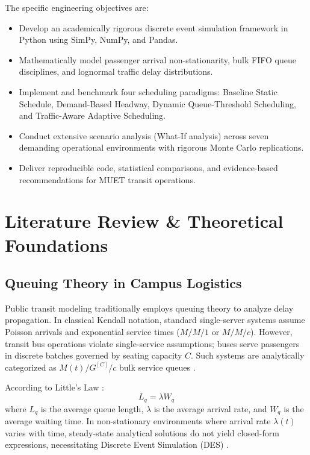\documentclass[conference]{IEEEtran}
\begin{document}
The specific engineering objectives are:
\begin{itemize}
    \item Develop an academically rigorous discrete event simulation framework in Python using SimPy, NumPy, and Pandas.
    \item Mathematically model passenger arrival non-stationarity, bulk FIFO queue disciplines, and lognormal traffic delay distributions.
    \item Implement and benchmark four scheduling paradigms: Baseline Static Schedule, Demand-Based Headway, Dynamic Queue-Threshold Scheduling, and Traffic-Aware Adaptive Scheduling.
    \item Conduct extensive scenario analysis (What-If analysis) across seven demanding operational environments with rigorous Monte Carlo replications.
    \item Deliver reproducible code, statistical comparisons, and evidence-based recommendations for MUET transit operations.
\end{itemize}

\section{Literature Review \& Theoretical Foundations}
\subsection{Queuing Theory in Campus Logistics}
Public transit modeling traditionally employs queuing theory to analyze delay propagation. In classical Kendall notation, standard single-server systems assume Poisson arrivals and exponential service times ($M/M/1$ or $M/M/c$). However, transit bus operations violate single-service assumptions; buses serve passengers in discrete batches governed by seating capacity $C$. Such systems are analytically categorized as $M(t)/G^{[C]}/c$ bulk service queues \cite{gross2008fundamentals, larson1981urban}. 

According to Little's Law \cite{little1961proof}:
\begin{equation}
L_q = \lambda W_q
\end{equation}
where $L_q$ is the average queue length, $\lambda$ is the average arrival rate, and $W_q$ is the average waiting time. In non-stationary environments where arrival rate $\lambda(t)$ varies with time, steady-state analytical solutions do not yield closed-form expressions, necessitating Discrete Event Simulation (DES) \cite{law2015simulation, banks2005discrete}.
\end{document}
